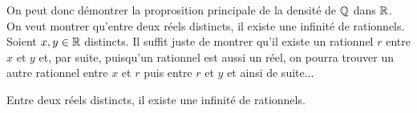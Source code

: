 On peut donc démontrer la proprosition principale de la densité de $\mathbb{Q}$ dans $\mathbb{R}$. 
On veut montrer qu'entre deux réels distincts, il existe une infinité de rationnels. 
Soient $x, y \in \mathbb{R}$ distincts. Il suffit juste de montrer qu'il existe un rationnel $r$ entre $x$ et $y$ et, par suite, 
puisqu'un rationnel est aussi un réel, on pourra trouver un autre rationnel entre $x$ et $r$ puis entre $r$ et $y$ et 
ainsi de suite... 

\begin{proposition}[Densité]
    Entre deux réels distincts, il existe une infinité de rationnels. 
\end{proposition}






